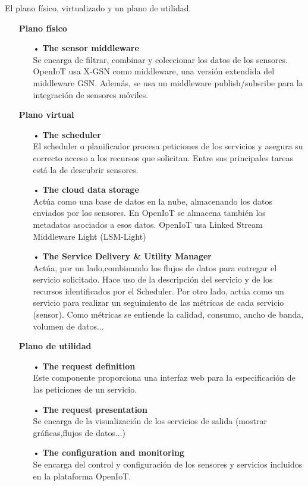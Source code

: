 \documentclass[12pt, twoside]{book}
\begin{document}
El plano físico, virtualizado y un plano de utilidad. 
\begin{itemize}
\item[] \textbf{Plano físico}
\begin{itemize}
\item[•] \textbf{The sensor middleware}\\
Se encarga de filtrar, combinar y coleccionar los datos de los sensores. OpenIoT usa X-GSN como middleware, una versión extendida del middleware GSN. Además, se usa un middleware publish/subsribe para la integración de sensores móviles.
\end{itemize}
\end{itemize}
\begin{itemize}
\item[] \textbf{Plano virtual}
\begin{itemize}
\item[•] \textbf{The scheduler}\\
El scheduler o planificador procesa peticiones de los servicios y asegura su correcto acceso a los recursos que solicitan. Entre sus principales tareas está la de descubrir sensores.  \\
\item[•] \textbf{The cloud data storage}\\
Actúa como una base de datos en la nube, almacenando los datos enviados por los sensores. En OpenIoT se almacena también los metadatos asociados a esos datos.
OpenIoT usa Linked Stream Middleware Light (LSM-Light) \\
\item[•] \textbf{The Service Delivery \& Utility Manager} \\
Actúa, por un lado,combinando los flujos de datos para entregar el servicio solicitado. Hace uso de la descripción del servicio y de los recursos identificados por el Scheduler. Por otro lado, actúa como un servicio para realizar un seguimiento de las métricas de cada servicio (sensor). Como métricas se entiende la calidad, consumo, ancho de banda, volumen de datos...\\

\end{itemize}
\item[] \textbf{Plano de utilidad}
\begin{itemize}
\item[•] \textbf{The request definition} \\
Este componente proporciona una interfaz web para la especificación de las peticiones de un servicio.
\item[•] \textbf{The request presentation} \\
Se encarga de la visualización de los servicios de salida (mostrar gráficas,flujos de datos...)
\item[•] \textbf{The configuration and monitoring} \\
Se encarga del control y configuración de los sensores y servicios incluidos en la plataforma OpenIoT.
\end{itemize}
\end{itemize}
\end{document}
